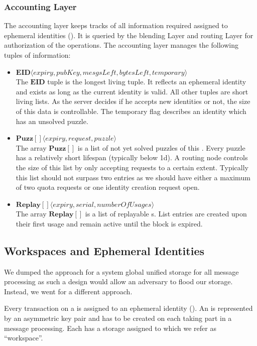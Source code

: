 \subsubsection{Accounting Layer\label{sec:accountingLayer}}
The accounting layer keeps tracks of all information required assigned to ephemeral identities (). It is queried by the blending Layer and routing Layer for authorization of the operations. The accounting layer manages the following tuples of information:
\begin{itemize}
	\item $\mathbf{EID}\langle expiry, pubKey, mesgsLeft, bytesLeft, temporary \rangle$\\
	The $\mathbf{EID}$ tuple is the longest living tuple. It reflects an ephemeral identity and exists as long as the current identity is valid. All other tuples are short living lists. As the server decides if he accepts new identities or not, the size of this data is controllable. The temporary flag describes an identity which has an unsolved puzzle. 
	\item $\mathbf{Puzz[]}\langle expiry, request, puzzle \rangle$\\
	The array $\mathbf{Puzz[]}$ is a list of not yet solved puzzles of this . Every puzzle has a relatively short lifespan (typically below 1d). A routing node controls the size of this list by only accepting requests to a certain extent. Typically this list should not surpass two entries as we should have either a maximum of two quota requests or one identity creation request open.
	\item $\mathbf{Replay[]}\langle expiry, serial, numberOfUsages \rangle$\\
	The array $\mathbf{Replay[]}$ is a list of replayable s. List entries are created upon their first usage and remain active until the block is expired. 
\end{itemize}


\subsection{Workspaces and Ephemeral Identities}
We dumped the approach for a system global unified storage for all message processing as such a design would allow an adversary to flood our storage. Instead, we went for a different approach.

Every transaction on a \VortexNode is assigned to an ephemeral identity (). An  is represented by an asymmetric key pair and has to be created on each \VortexNode taking part in a message processing. Each  has a storage assigned to which we refer as ``workspace''.

